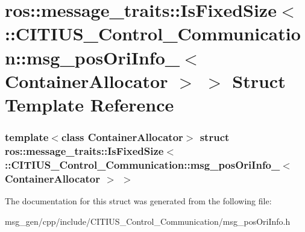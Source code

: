 \hypertarget{structros_1_1message__traits_1_1_is_fixed_size_3_01_1_1_c_i_t_i_u_s___control___communication_1_8ab004737812378b8366f33971bf22e6}{\section{ros\-:\-:message\-\_\-traits\-:\-:\-Is\-Fixed\-Size$<$ \-:\-:\-C\-I\-T\-I\-U\-S\-\_\-\-Control\-\_\-\-Communication\-:\-:msg\-\_\-pos\-Ori\-Info\-\_\-$<$ \-Container\-Allocator $>$ $>$ \-Struct \-Template \-Reference}
\label{structros_1_1message__traits_1_1_is_fixed_size_3_01_1_1_c_i_t_i_u_s___control___communication_1_8ab004737812378b8366f33971bf22e6}
}
\subsubsection*{template$<$class Container\-Allocator$>$ struct ros\-::message\-\_\-traits\-::\-Is\-Fixed\-Size$<$ \-::\-C\-I\-T\-I\-U\-S\-\_\-\-Control\-\_\-\-Communication\-::msg\-\_\-pos\-Ori\-Info\-\_\-$<$ Container\-Allocator $>$ $>$}



\-The documentation for this struct was generated from the following file\-:\begin{DoxyCompactItemize}
\item 
msg\-\_\-gen/cpp/include/\-C\-I\-T\-I\-U\-S\-\_\-\-Control\-\_\-\-Communication/msg\-\_\-pos\-Ori\-Info.\-h\end{DoxyCompactItemize}
